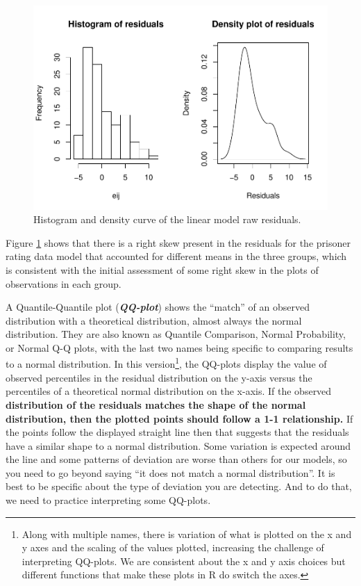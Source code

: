 \documentclass[]{book}
\let\rmarkdownfootnote\footnote%
\def\footnote{\protect\rmarkdownfootnote}
\theoremstyle{definition}
\theoremstyle{definition}
\theoremstyle{remark}
\begin{document}
\begin{figure}
\centering
\includegraphics{03-oneWayAnova_files/figure-latex/Figure3-10-1.pdf}
\caption{\label{fig:Figure3-10}Histogram and density curve of the linear model raw
residuals.}
\end{figure}

Figure \ref{fig:Figure3-10} shows that there is a right skew present in
the residuals for the prisoner rating data model that accounted for
different means in the three groups, which is consistent with the
initial assessment of some right skew in the plots of observations in
each group.

A Quantile-Quantile plot (\textbf{\emph{QQ-plot}}) shows the ``match''
of an observed distribution with a theoretical distribution, almost
always the normal distribution. They are also known as Quantile
Comparison, Normal Probability, or Normal Q-Q plots, with the last two
names being specific to comparing results to a normal distribution. In
this version\footnote{Along with multiple names, there is variation of
  what is plotted on the x and y axes and the scaling of the values
  plotted, increasing the challenge of interpreting QQ-plots. We are
  consistent about the x and y axis choices but different functions that
  make these plots in R do switch the axes.}, the QQ-plots display the
value of observed percentiles in the residual distribution on the y-axis
versus the percentiles of a theoretical normal distribution on the
x-axis. If the observed \textbf{distribution of the residuals matches
the shape of the normal distribution, then the plotted points should
follow a 1-1 relationship.} If the points follow the displayed straight
line then that suggests that the residuals have a similar shape to a
normal distribution. Some variation is expected around the line and some
patterns of deviation are worse than others for our models, so you need
to go beyond saying ``it does not match a normal distribution''. It is
best to be specific about the type of deviation you are detecting. And
to do that, we need to practice interpreting some QQ-plots.
\end{document}
